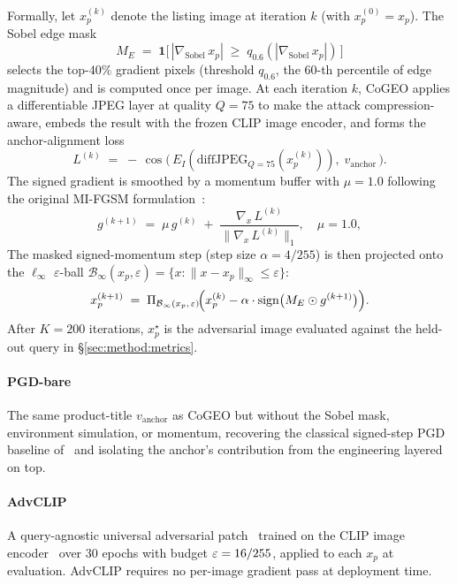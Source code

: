Formally, let $x_p^{(k)}$ denote the listing image at iteration $k$ (with $x_p^{(0)}{=}x_p$). The Sobel edge mask
\begin{equation}
M_E \;=\; \mathbf{1}\!\bigl[\,|\nabla_{\mathrm{Sobel}}\,x_p|\;\geq\;q_{0.6}(|\nabla_{\mathrm{Sobel}}\,x_p|)\,\bigr]
\label{eq:sobel_mask}
\end{equation}
selects the top-$40\%$ gradient pixels (threshold $q_{0.6}$, the $60$-th percentile of edge magnitude) and is computed once per image. At each iteration $k$, CoGEO applies a differentiable JPEG layer at quality $Q{=}75$ to make the attack compression-aware, embeds the result with the frozen CLIP image encoder, and forms the anchor-alignment loss
\begin{equation}
L^{(k)} \;=\; -\,\cos\!\bigl(\,E_I(\mathrm{diffJPEG}_{Q=75}(x_p^{(k)})),\; v_{\mathrm{anchor}}\,\bigr).
\label{eq:anchor_loss}
\end{equation}
The signed gradient is smoothed by a momentum buffer with $\mu=1.0$ following the original MI-FGSM formulation~\cite{dong2018mifgsm}:
\begin{equation}
g^{(k+1)} \;=\; \mu\,g^{(k)} \;+\; \frac{\nabla_{x}\,L^{(k)}}{\lVert\nabla_{x}\,L^{(k)}\rVert_1}, \quad \mu = 1.0,
\label{eq:mifgsm_momentum}
\end{equation}
The masked signed-momentum step (step size $\alpha = 4/255$) is then projected onto the $\ell_\infty$ $\varepsilon$-ball $\mathcal{B}_\infty(x_p,\varepsilon){=}\{x:\lVert x-x_p\rVert_\infty{\leq}\varepsilon\}$:
\begin{equation}
x_p^{(k+1)} \;=\; \Pi_{\mathcal{B}_\infty(x_p,\,\varepsilon)}\!\Bigl( x_p^{(k)} - \alpha \cdot \mathrm{sign}\bigl(M_E \odot g^{(k+1)}\bigr) \Bigr).
\label{eq:masked_step}
\end{equation}
After $K{=}200$ iterations, $x_p^{\star}$ is the adversarial image evaluated against the held-out query in \S\ref{sec:method:metrics}.

\paragraph{PGD-bare} The same product-title $v_{\text{anchor}}$ as CoGEO but without the Sobel mask, environment simulation, or momentum, recovering the classical signed-step PGD baseline of~\cite{madry2018pgd} and isolating the anchor's contribution from the engineering layered on top.

\paragraph{AdvCLIP} A query-agnostic universal adversarial patch~\cite{moosavidezfooli2017uap,thys2019adversarialpatches} trained on the CLIP image encoder~\cite{zhou2023advclip} over 30 epochs with budget $\varepsilon = 16/255$, applied to each $x_p$ at evaluation. AdvCLIP requires no per-image gradient pass at deployment time.


